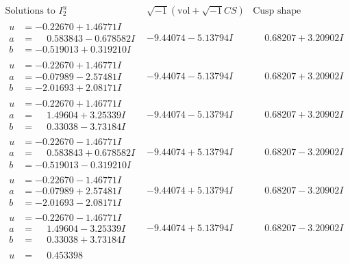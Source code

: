 \documentclass[1p]{elsarticle_modified}
\theoremstyle{definition}
\newcommand{\I}{\sqrt{-1}}
\begin{document}
$$\begin{array}{c|c|c}  
\text{Solutions to }I^u_{2}& \I (\text{vol} + \sqrt{-1}CS) & \text{Cusp shape}\\
 \hline 
\begin{aligned}
u &= -0.22670 + 1.46771 I \\
a &= \phantom{-}0.583843 - 0.678582 I \\
b &= -0.519013 + 0.319210 I\end{aligned}
 & -9.44074 - 5.13794 I & \phantom{-}0.68207 + 3.20902 I \\ \hline\begin{aligned}
u &= -0.22670 + 1.46771 I \\
a &= -0.07989 - 2.57481 I \\
b &= -2.01693 + 2.08171 I\end{aligned}
 & -9.44074 - 5.13794 I & \phantom{-}0.68207 + 3.20902 I \\ \hline\begin{aligned}
u &= -0.22670 + 1.46771 I \\
a &= \phantom{-}1.49604 + 3.25339 I \\
b &= \phantom{-}0.33038 - 3.73184 I\end{aligned}
 & -9.44074 - 5.13794 I & \phantom{-}0.68207 + 3.20902 I \\ \hline\begin{aligned}
u &= -0.22670 - 1.46771 I \\
a &= \phantom{-}0.583843 + 0.678582 I \\
b &= -0.519013 - 0.319210 I\end{aligned}
 & -9.44074 + 5.13794 I & \phantom{-}0.68207 - 3.20902 I \\ \hline\begin{aligned}
u &= -0.22670 - 1.46771 I \\
a &= -0.07989 + 2.57481 I \\
b &= -2.01693 - 2.08171 I\end{aligned}
 & -9.44074 + 5.13794 I & \phantom{-}0.68207 - 3.20902 I \\ \hline\begin{aligned}
u &= -0.22670 - 1.46771 I \\
a &= \phantom{-}1.49604 - 3.25339 I \\
b &= \phantom{-}0.33038 + 3.73184 I\end{aligned}
 & -9.44074 + 5.13794 I & \phantom{-}0.68207 - 3.20902 I \\ \hline\begin{aligned}
u &= \phantom{-}0.453398\phantom{ +0.000000I} \\

\end{aligned}
\end{array}$$
\end{document}
